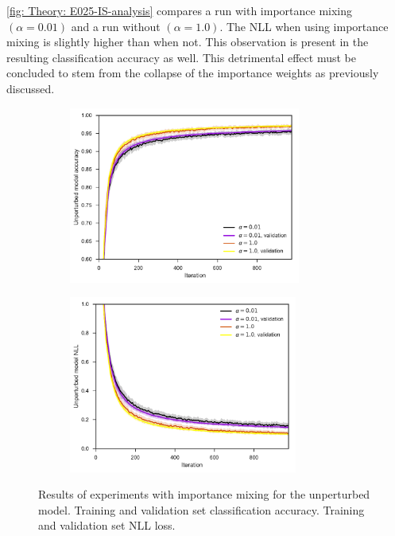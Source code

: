 \autoref{fig: Theory: E025-IS-analysis} compares a run with importance mixing $(\alpha=0.01)$ and a run without $(\alpha=1.0)$. The \gls{NLL} when using importance mixing is slightly higher than when not. This observation is present in the resulting classification accuracy as well. This detrimental effect must be concluded to stem from the collapse of the importance weights as previously discussed.

\begin{figure}[tbp!]
    \begin{subfigure}[b]{0.49\textwidth}
        \centering
        \includegraphics[height=5.8cm]{graphics/E025-IS-analysis/accuracy_unp-all-series-mean-sd.pdf}
        \caption{}
        \label{fig: Theory: E025-IS-analysis/accuracy_unp-all-series-mean-sd}
    \end{subfigure}
    \hfill
    \begin{subfigure}[b]{0.49\textwidth}
        \centering
        \includegraphics[height=5.8cm]{graphics/E025-IS-analysis/return_unp-all-series-mean-sd.pdf}
        \caption{}
        \label{fig: Theory: E025-IS-analysis/return_unp-all-series-mean-sd}
    \end{subfigure}
    \caption{
        Results of experiments with importance mixing for the unperturbed model.
         Training and validation set classification accuracy.
         Training and validation set \gls{NLL} loss.
    }
    \label{fig: Theory: E025-IS-analysis}
\end{figure}

